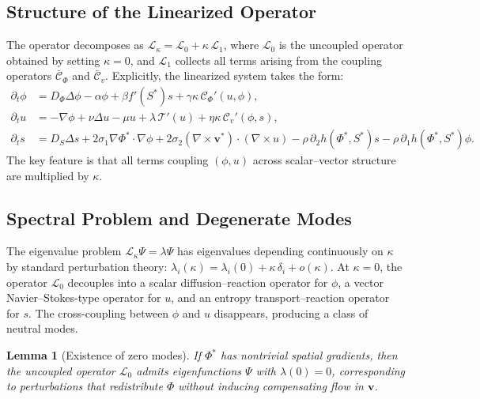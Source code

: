 \documentclass[11pt, a4paper]{article}
\theoremstyle{plain}
\newtheorem{lemma}[theorem]{Lemma}
\theoremstyle{definition}
\newcommand{\Phifield}{\Phi}
\newcommand{\vfield}{\mathbf{v}}
\newcommand{\Sfield}{S}
\newcommand{\coupling}{\kappa}
\begin{document}
\subsection{Structure of the Linearized Operator}

The operator decomposes as $\mathcal{L}_\coupling = \mathcal{L}_0 + \coupling\, \mathcal{L}_1$,
where $\mathcal{L}_0$ is the uncoupled operator obtained by setting
$\coupling = 0$, and $\mathcal{L}_1$ collects all terms arising from
the coupling operators $\bar{\mathcal{C}}_\Phi$ and $\bar{\mathcal{C}}_v$.
Explicitly, the linearized system takes the form:
\begin{align*}
  \partial_t \phi
  &= D_\Phi \Delta \phi
     - \alpha \phi
     + \beta f'(\Sfield^*) s
     + \gamma \coupling\, \mathcal{C}_\Phi'(u, \phi), \\[4pt]
  \partial_t u
  &= -\nabla \phi
     + \nu \Delta u
     - \mu u
     + \lambda\, \mathcal{T}'(u)
     + \eta \coupling\, \mathcal{C}_v'(\phi, s), \\[4pt]
  \partial_t s
  &= D_S \Delta s
     + 2\sigma_1 \nabla \Phifield^* \cdot \nabla \phi
     + 2\sigma_2 (\nabla \times \vfield^*) \cdot (\nabla \times u)
     - \rho\, \partial_2 h(\Phifield^*, \Sfield^*) s
     - \rho\, \partial_1 h(\Phifield^*, \Sfield^*) \phi.
\end{align*}
The key feature is that all terms coupling $(\phi, u)$ across scalar--vector
structure are multiplied by $\coupling$.

\subsection{Spectral Problem and Degenerate Modes}

The eigenvalue problem $\mathcal{L}_\coupling \Psi = \lambda \Psi$ has
eigenvalues depending continuously on $\coupling$ by standard perturbation
theory: $\lambda_i(\coupling) = \lambda_i(0) + \coupling\, \delta_i + o(\coupling)$.
At $\coupling = 0$, the operator $\mathcal{L}_0$ decouples into a scalar
diffusion--reaction operator for $\phi$, a vector Navier--Stokes-type operator
for $u$, and an entropy transport--reaction operator for $s$. The cross-coupling
between $\phi$ and $u$ disappears, producing a class of neutral modes.

\begin{lemma}[Existence of zero modes]
\label{lem:zero_modes}
If $\Phifield^*$ has nontrivial spatial gradients, then the uncoupled operator
$\mathcal{L}_0$ admits eigenfunctions $\Psi$ with $\lambda(0) = 0$,
corresponding to perturbations that redistribute $\Phifield$ without
inducing compensating flow in $\vfield$.
\end{lemma}
\end{document}
